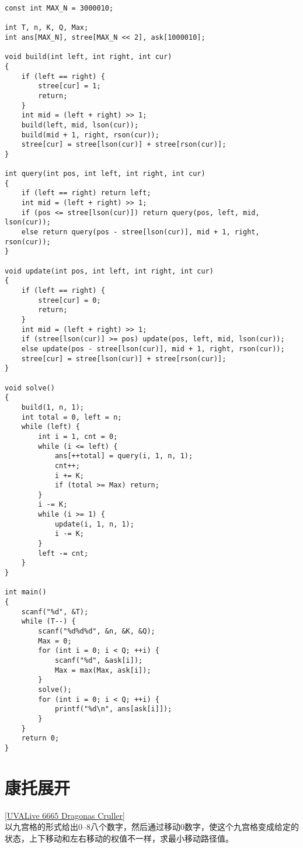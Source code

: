 \begin{lstlisting}
const int MAX_N = 3000010;

int T, n, K, Q, Max;
int ans[MAX_N], stree[MAX_N << 2], ask[1000010];

void build(int left, int right, int cur)
{
	if (left == right) {
		stree[cur] = 1;
		return;
	}
	int mid = (left + right) >> 1;
	build(left, mid, lson(cur));
	build(mid + 1, right, rson(cur));
	stree[cur] = stree[lson(cur)] + stree[rson(cur)];
}

int query(int pos, int left, int right, int cur)
{
	if (left == right) return left;
	int mid = (left + right) >> 1;
	if (pos <= stree[lson(cur)]) return query(pos, left, mid, lson(cur));
	else return query(pos - stree[lson(cur)], mid + 1, right, rson(cur));
}

void update(int pos, int left, int right, int cur)
{
	if (left == right) {
		stree[cur] = 0;
		return;
	}
	int mid = (left + right) >> 1;
	if (stree[lson(cur)] >= pos) update(pos, left, mid, lson(cur));
	else update(pos - stree[lson(cur)], mid + 1, right, rson(cur));
	stree[cur] = stree[lson(cur)] + stree[rson(cur)];
}

void solve()
{
	build(1, n, 1);
	int total = 0, left = n;
	while (left) {
		int i = 1, cnt = 0;
		while (i <= left) {
			ans[++total] = query(i, 1, n, 1);
			cnt++;
			i += K;
			if (total >= Max) return;
		}
		i -= K;
		while (i >= 1) {
			update(i, 1, n, 1);
			i -= K;
		}
		left -= cnt;
	}
}

int main()
{
	scanf("%d", &T);
	while (T--) {
		scanf("%d%d%d", &n, &K, &Q);
		Max = 0;
		for (int i = 0; i < Q; ++i) {
			scanf("%d", &ask[i]);
			Max = max(Max, ask[i]);
		}
		solve();
		for (int i = 0; i < Q; ++i) {
			printf("%d\n", ans[ask[i]]);
		}
	}
	return 0;
}
\end{lstlisting}

\clearpage
\section{康托展开}
\underline {[UVALive 6665 Dragonas Cruller]} \\
以九宫格的形式给出0--8八个数字，然后通过移动0数字，使这个九宫格变成给定的状态，上下移动和左右移动的权值不一样，求最小移动路径值。\\

